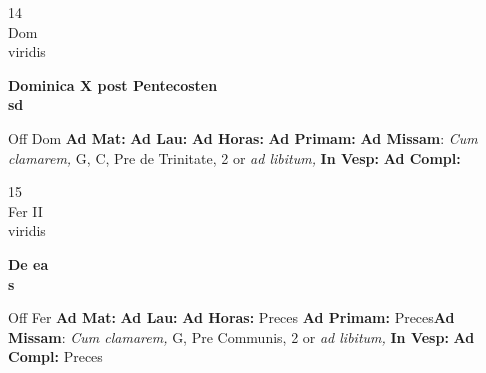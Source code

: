 \documentclass[10pt, openany]{book}
\begin{document}
    \begin{center}
        \begin{minipage}{3.5in}
            \vspace{2em}
            \begin{minipage}{0.5in}
                {\Huge 14} \\
                {\normalsize Dom} \\
                {\normalsize viridis}
            \end{minipage}
            \begin{minipage}{3.0in}
                \textbf{ \large Dominica X post Pentecosten \\
                \textnormal{\normalsize sd}} \\ 
            \end{minipage}
            \begin{justify}Off Dom
                \textbf{Ad Mat: }
                \textbf{Ad Lau: }
                \textbf{Ad Horas: }
                \textbf{Ad Primam: }\textbf{Ad Missam}: \textit{Cum clamarem,} G, C, Pre de Trinitate, 2 or \textit{ad libitum,}  
                \textbf{In Vesp: }
                \textbf{Ad Compl: }
            \end{justify}
        \end{minipage}
    \end{center}

    \begin{center}
        \begin{minipage}{3.5in}
            \vspace{2em}
            \begin{minipage}{0.5in}
                {\Huge 15} \\
                {\normalsize Fer II} \\
                {\normalsize viridis}
            \end{minipage}
            \begin{minipage}{3.0in}
                \textbf{ \large De ea \\
                \textnormal{\normalsize s}} \\ 
            \end{minipage}
            \begin{justify}Off Fer
                \textbf{Ad Mat: }
                \textbf{Ad Lau: }
                \textbf{Ad Horas: }Preces
                \textbf{Ad Primam: }Preces\textbf{Ad Missam}: \textit{Cum clamarem,} G, Pre Communis, 2 or \textit{ad libitum,}  
                \textbf{In Vesp: }
                \textbf{Ad Compl: }Preces
            \end{justify}
        \end{minipage}
    \end{center}
\end{document}
